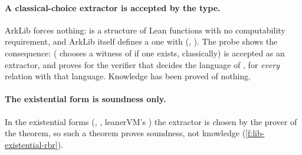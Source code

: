 \paragraph{A classical-choice extractor is accepted by the type.} ArkLib forces nothing:
 is a structure of Lean functions with no computability requirement,
and ArkLib itself defines a  one with 
(\allowbreak{}\allowbreak{}, \allowbreak{}).
The probe  shows the consequence:  ( chooses a
witness of  if one exists, classically) is accepted as an extractor, and
 proves \allowbreak{}
for the verifier that decides the language of , for \emph{every} relation  with
that language. Knowledge has been proved of nothing.

\paragraph{The existential form is soundness only.} In the existential forms
(, , leanerVM's
\allowbreak{}\allowbreak{}) the extractor is chosen by the prover of the theorem, so
such a theorem proves soundness, not knowledge (\cref{f:lib-existential-rbr}).

